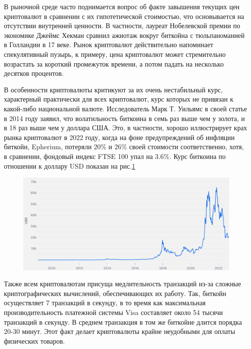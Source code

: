 \documentclass[12pt,a4paper]{article}
\begin{document}
В рыночной среде часто поднимается вопрос об факте завышения текущих цен криптовалют в сравнении с их гипотетической стоимостью, что основывается на отсутствии внутренней ценности. В частности, лауреат Нобелевской премии по экономике Джеймс Хекман сравнил ажиотаж вокруг биткойна с тюльпаноманией в Голландии в 17 веке.\cite{cite6} Рынок криптовалют действительно напоминает спекулятивный пузырь, к примеру, цена криптовалют может стремительно возрастать за короткий промежуток времени, а потом падать на несколько десятков процентов.

В особенности криптовалюты критикуют за их очень нестабильный курс, характерный практически для всех криптовалют, курс которых не привязан к какой-либо национальной валюте. Исследователь Марк Т. Уильямс в своей статье в 2014 году заявил, что волатильность биткоина в семь раз выше чем у золота, и в 18 раз выше чем у доллара США. Это, в частности, хорошо иллюстрирует крах рынка криптовалют в 2022 году, когда на фоне предупреждений об инфляции биткойн, Epherium, потеряли 20\% и 26\% своей стоимости соответственно, хотя, в сравнении, фондовый индекс FTSE 100 упал на 3.6\%.\cite{cite7} Курс биткоина по отношении к доллару USD показан на рис.\ref{fig:mesh1}

\begin{figure}[h]
    \centering
    \includegraphics[width=1\textwidth]{pic2}
    \caption{}
    \label{fig:mesh1}
\end{figure}

Также всем криптовалютам присуща медлительность транзакций из-за сложные криптографических вычислений, обеспечивающих их работу. Так, биткойн осуществляет 7 транзакций в секунду, в то время как максимальная производительность платежной системы Visa составляет около 54 тысячи транзакций в секунду. В среднем транзакция в том же биткойне длится порядка 20-30 минут. Этот факт делает криптовалюты крайне неудобными для оплаты физических товаров.\cite{cite8}
\end{document}
